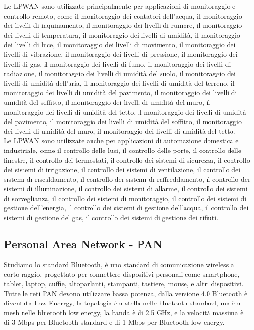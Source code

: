 Le LPWAN sono utilizzate principalmente per applicazioni di monitoraggio e controllo remoto, come il monitoraggio dei contatori dell'acqua, il monitoraggio dei livelli di inquinamento, il monitoraggio dei livelli di rumore, il monitoraggio dei livelli di temperatura, il monitoraggio dei livelli di umidità, il monitoraggio dei livelli di luce, il monitoraggio dei livelli di movimento, il monitoraggio dei livelli di vibrazione, il monitoraggio dei livelli di pressione, il monitoraggio dei livelli di gas, il monitoraggio dei livelli di fumo, il monitoraggio dei livelli di radiazione, il monitoraggio dei livelli di umidità del suolo, il monitoraggio dei livelli di umidità dell'aria, il monitoraggio dei livelli di umidità del terreno, il monitoraggio dei livelli di umidità del pavimento, il monitoraggio dei livelli di umidità del soffitto, il monitoraggio dei livelli di umidità del muro, il monitoraggio dei livelli di umidità del tetto, il monitoraggio dei livelli di umidità del pavimento, il monitoraggio dei livelli di umidità del soffitto, il monitoraggio dei livelli di umidità del muro, il monitoraggio dei livelli di umidità del tetto.\\

Le LPWAN sono utilizzate anche per applicazioni di automazione domestica e industriale, come il controllo delle luci, il controllo delle porte, il controllo delle finestre, il controllo dei termostati, il controllo dei sistemi di sicurezza, il controllo dei sistemi di irrigazione, il controllo dei sistemi di ventilazione, il controllo dei sistemi di riscaldamento, il controllo dei sistemi di raffreddamento, il controllo dei sistemi di illuminazione, il controllo dei sistemi di allarme, il controllo dei sistemi di sorveglianza, il controllo dei sistemi di monitoraggio, il controllo dei sistemi di gestione dell'energia, il controllo dei sistemi di gestione dell'acqua, il controllo dei sistemi di gestione del gas, il controllo dei sistemi di gestione dei rifiuti.\\

\subsection{Personal Area Network - PAN}
Studiamo lo standard Bluetooth, è uno standard di comunicazione wireless a corto raggio, progettato per connettere dispositivi personali come smartphone, tablet, laptop, cuffie, altoparlanti, stampanti, tastiere, mouse, e altri dispositivi.\\
Tutte le reti PAN devono utilizzare bassa potenza, dalla versione 4.0 Bluetooth è diventata Low Enerrgy, la topologia è a stella nelle bluetooth standard, ma è a mesh nelle bluetooth low energy, la banda è di 2.5 GHz, e la velocità massima è di 3 Mbps per Bluetooth standard e di 1 Mbps per Bluetooth low energy.\\

